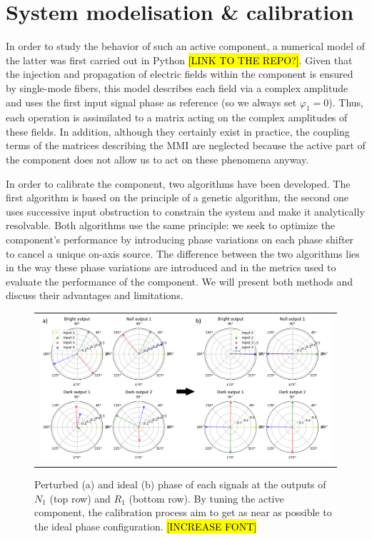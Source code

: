 \documentclass{aa}
\begin{document}
        
    \section{System modelisation \& calibration}

        In order to study the behavior of such an active component, a numerical model of the latter was first carried out in Python \hl{[LINK TO THE REPO?]}. Given that the injection and propagation of electric fields within the component is ensured by single-mode fibers, this model describes each field via a complex amplitude and uses the first input signal phase as reference (so we always set $\varphi_1 = 0$). Thus, each operation is assimilated to a matrix acting on the complex amplitudes of these fields. In addition, although they certainly exist in practice, the coupling terms of the matrices describing the MMI are neglected because the active part of the component does not allow us to act on these phenomena anyway.
    
        In order to calibrate the component, two algorithms have been developed. The first algorithm is based on the principle of a genetic algorithm, the second one uses successive input obstruction to constrain the system and make it analytically resolvable. Both algorithms use the same principle: we seek to optimize the component's performance by introducing phase variations on each phase shifter to cancel a unique on-axis source. The difference between the two algorithms lies in the way these phase variations are introduced and in the metrics used to evaluate the performance of the component. We will present both methods and discuss their advantages and limitations.
    
        \begin{figure}[H]
            \begin{center}
            \begin{tabular}{c}
            \includegraphics[width=\linewidth]{img/phases.png}
            \end{tabular}
            \end{center}
            \caption[phases] 
            { \label{fig:phases} 
            Perturbed (a) and ideal (b) phase of each signals at the outputs of $N_1$ (top row) and $R_1$ (bottom row). By tuning the active component, the calibration process aim to get as near as possible to the ideal phase configuration. \hl{[INCREASE FONT]}}
        \end{figure}
    
\end{document}
